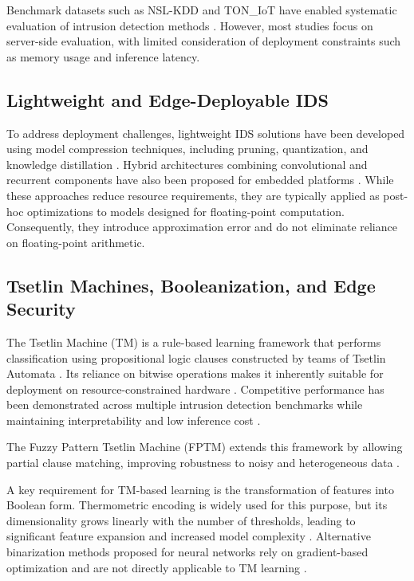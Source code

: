 \documentclass[journal,twoside,web]{ieeecolor}
\begin{document}
Benchmark datasets such as NSL-KDD and TON\_IoT have enabled
systematic evaluation of intrusion detection methods
\cite{tavallaee2009nslkdd, moustafa2021toniot}. However, most studies
focus on server-side evaluation, with limited consideration of
deployment constraints such as memory usage and inference latency.

\subsection{Lightweight and Edge-Deployable IDS}

To address deployment challenges, lightweight IDS solutions have been
developed using model compression techniques, including pruning,
quantization, and knowledge distillation \cite{liu2025compression}.
Hybrid architectures combining convolutional and recurrent components
have also been proposed for embedded platforms
\cite{jouhari2024lightweight}. While these approaches reduce resource
requirements, they are typically applied as post-hoc optimizations to
models designed for floating-point computation. Consequently, they
introduce approximation error and do not eliminate reliance on
floating-point arithmetic.

\subsection{Tsetlin Machines, Booleanization, and Edge Security}

The Tsetlin Machine (TM) is a rule-based learning framework that
performs classification using propositional logic clauses constructed
by teams of Tsetlin Automata \cite{granmo2018tsetlin}. Its reliance on
bitwise operations makes it inherently suitable for deployment on
resource-constrained hardware \cite{kundu2025review}. Competitive
performance has been demonstrated across multiple intrusion detection
benchmarks while maintaining interpretability and low inference cost
\cite{abeyrathna2020intrusion, gunvaldsen2023iot, jaiswal2025iomt}.

The Fuzzy Pattern Tsetlin Machine (FPTM) extends this framework by
allowing partial clause matching, improving robustness to noisy and
heterogeneous data \cite{hnilov2025fptm}.

A key requirement for TM-based learning is the transformation of
features into Boolean form. Thermometric encoding is widely used for
this purpose, but its dimensionality grows linearly with the number of
thresholds, leading to significant feature expansion and increased
model complexity \cite{granmo2018tsetlin, gunvaldsen2023iot}.
Alternative binarization methods proposed for neural networks rely on
gradient-based optimization and are not directly applicable to TM
learning \cite{nguyen2025binarized}.
\end{document}
